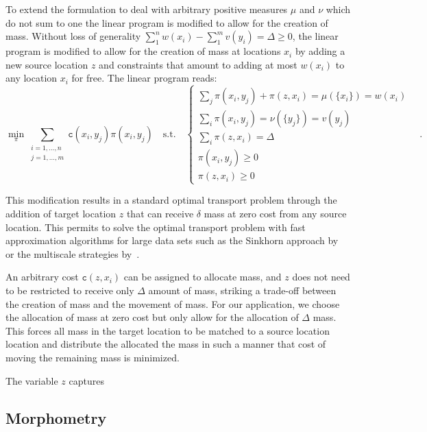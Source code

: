 \documentclass{llncs}
\newcommand{\cost}[0]{\mathtt{c}}
\newcommand{\coupling}[0]{\pi}
\begin{document}
{To extend the formulation to deal with arbitrary positive measures $\mu$ and
$\nu$ which do not sum to one the linear program is modified to allow for the
creation of mass. Without loss of generality $\sum_1^n w(x_i)  - \sum_1^m
v(y_i) = \Delta \ge 0$, the linear program is modified to allow for the
creation of mass at locations $x_i$ by adding a new source location $z$ and
constraints that amount to adding at most $w(x_i)$ to any location $x_i$ for
free. The linear program reads: 
\begin{equation}
\min_\coupling \sum_{\substack{i=1,\dots,n\\ j=1,\dots,m}} 
      \cost(x_i, y_j) \coupling(x_i, y_j) \quad \text{s.t.}\quad 
\begin{cases}
  \sum_j \coupling(x_i, y_j) + \coupling(z, x_i) = \mu(\{x_i\}) = w(x_i) & \\ 
  \sum_i \coupling(x_i, y_j) = \nu(\{y_j\}) = v(y_j) & \\
  \sum_i \coupling(z, x_i)  = \Delta \\
  \coupling(x_i, y_j) \ge 0 \\
  \coupling(z, x_i) \ge 0
\end{cases}\,.
\label{e:LPformulation}
\end{equation} 

This modification results in a standard optimal transport problem through the
addition of target location $z$ that can receive $\delta$ mass at zero cost
from any source location.  This permits to solve the optimal transport problem
with fast approximation algorithms for large data sets such as the Sinkhorn
approach by~\cite{cutuiri:} or the multiscale strategies
by~\citet{gerber:jmlr17}. 

An arbitrary cost $\cost(z, x_i)$ can be assigned to allocate mass, and $z$
does not need to be restricted to receive only $\Delta$ amount of mass,
striking a trade-off between the creation of mass and the movement of mass. For
our application, we choose the allocation of mass at zero cost but only allow
for the allocation of $\Delta$ mass. This forces all mass in the target
location to be matched to a source location location and distribute the
allocated the mass in such a manner that cost of moving the remaining mass is
minimized.

The variable $z$ captures


\subsection{Morphometry}




}
\end{document}
